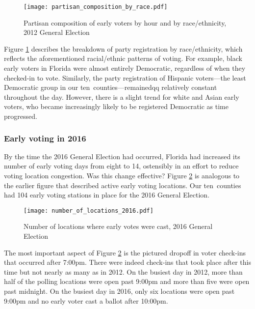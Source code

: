 \documentclass[12pt,titlepage]{article}
\newcommand{\numcounties}{ten}
\begin{document}
\begin{figure}[!ht]
\caption{Partisan composition of early voters by hour and by race/ethnicity, 2012
  General Election}
  \label{fig:party2012}
  \centering
    \centering\texttt{[image: partisan\_composition\_by\_race.pdf]}
\end{figure}

%

Figure \ref{fig:party2012} describes the breakdown of party
registration by race/ethnicity, which reflects the aforementioned
racial/ethnic patterns of voting.  For example, black early voters in
Florida were almost entirely Democratic, regardless of when they
checked-in to vote.  Similarly, the party registration of Hispanic
voters---the least Democratic group in our \numcounties\
counties---remainedqq relatively constant throughout the day.
However, there is a slight trend for white and Asian early voters, who
became increasingly likely to be registered Democratic as time
progressed.


\subsubsection*{Early voting in 2016}

By the time the 2016 General Election had occurred, Florida had
increased its number of early voting days from eight to 14, ostensibly
in an effort to reduce voting location congestion. Was this change
effective?  Figure \ref{fig:nrlocs2016} is analogous to the earlier
figure that described active early voting locations. Our \numcounties\
counties had 104 early voting stations in place for the 2016 General
Election.


\begin{figure}[!ht]
  \caption{Number of locations where early votes were cast, 2016 General
    Election}
  \label{fig:nrlocs2016}
  \centering
    \centering\texttt{[image: number\_of\_locations\_2016.pdf]}
\end{figure}

The most important aspect of Figure \ref{fig:nrlocs2016} is the
pictured dropoff in voter check-ins that occurred after 7:00pm. There
were indeed check-ins that took place after this time but not nearly
as many as in 2012. On the busiest day in 2012, more than half of the
polling locations were open past 9:00pm and more than five were open
past midnight. On the busiest day in 2016, only six locations were
open past 9:00pm and no early voter cast a ballot after 10:00pm.
\end{document}
